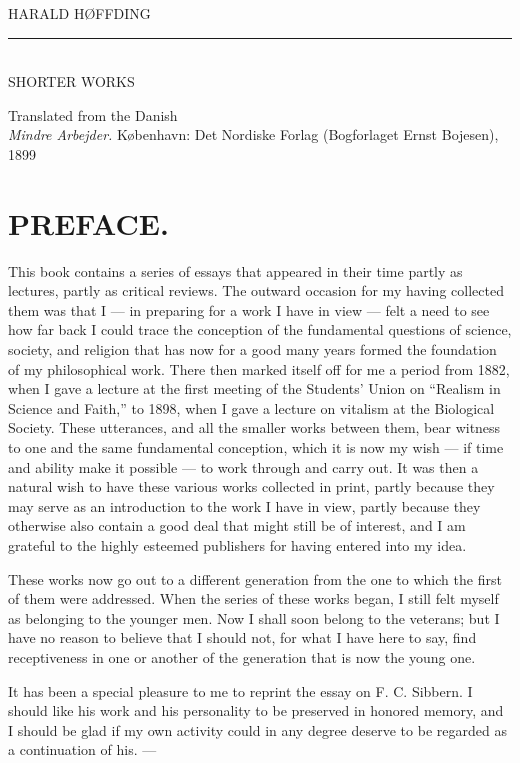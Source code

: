 \documentclass[12pt,a4paper,openany]{book}
\newcommand{\opage}[1]{\marginnote{\footnotesize\textit{[#1]}}}
\begin{document}
\frontmatter
\begin{titlepage}\centering\vspace*{2cm}
{\large HARALD HØFFDING}\\[1ex]\rule{3em}{0.4pt}\\[3ex]{\Huge SHORTER WORKS}\par\vfill
{\small Translated from the Danish}\\[0.6em]
{\small \textit{Mindre Arbejder.} København: Det Nordiske Forlag (Bogforlaget Ernst Bojesen), 1899}
\end{titlepage}
\opage{V}
\chapter*{PREFACE.}

This book contains a series of essays that appeared in their
time partly as lectures, partly as critical reviews. The outward occasion for
my having collected them was that I --- in preparing for
a work I have in view --- felt a need to see how far back
I could trace the conception of the fundamental questions of science, society, and
religion that has now for a good many years formed
the foundation of my philosophical work. There then marked itself off
for me a period from 1882, when I gave a lecture at the first
meeting of the Students' Union on ``Realism in
Science and Faith,'' to 1898, when I gave a lecture on vitalism
at the Biological Society. These utterances, and all the
smaller works between them, bear witness to one and the same
fundamental conception, which it is now my wish --- if time and ability
make it possible --- to work through and carry out. It was then
a natural wish to have these various works collected
in print, partly because they may serve as an introduction to the
work I have in view, partly because they otherwise also contain
a good deal that might still be of interest, and I am grateful
to the highly esteemed publishers for having entered into my
idea.

\opage{VI}These works now go out to a different generation from the one
to which the first of them were addressed. When
the series of these works began, I still felt myself as belonging to
the younger men. Now I shall soon belong to the veterans; but I
have no reason to believe that I should not, for what I have here
to say, find receptiveness in one or another of the
generation that is now the young one.

It has been a special pleasure to me to reprint
the essay on F. C. Sibbern. I should like his
work and his personality to be preserved in honored memory,
and I should be glad if my own activity could in any
degree deserve to be regarded as a continuation
of his. ---
\end{document}
